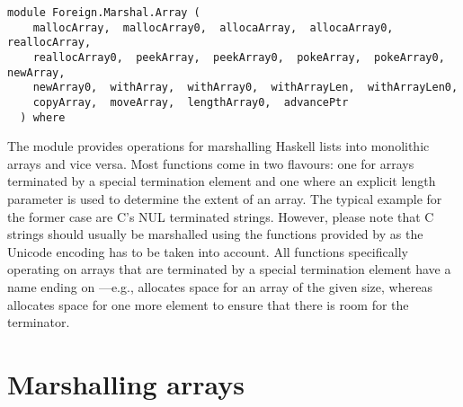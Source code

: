 \label{module:Foreign.Marshal.Array}
\haddockbeginheader
{\haddockverb\begin{verbatim}
module Foreign.Marshal.Array (
    mallocArray,  mallocArray0,  allocaArray,  allocaArray0,  reallocArray, 
    reallocArray0,  peekArray,  peekArray0,  pokeArray,  pokeArray0,  newArray, 
    newArray0,  withArray,  withArray0,  withArrayLen,  withArrayLen0, 
    copyArray,  moveArray,  lengthArray0,  advancePtr
  ) where\end{verbatim}}
\haddockendheader

The module  provides operations for marshalling Haskell
lists into monolithic arrays and vice versa.  Most functions come in two
flavours: one for arrays terminated by a special termination element and one
where an explicit length parameter is used to determine the extent of an
array.  The typical example for the former case are C's NUL terminated
strings.  However, please note that C strings should usually be marshalled
using the functions provided by  as
the Unicode encoding has to be taken into account.  All functions specifically
operating on arrays that are terminated by a special termination element have
a name ending on ---e.g.,  allocates space for an
array of the given size, whereas  allocates space for one
more element to ensure that there is room for the terminator.
\par

\section{Marshalling arrays
}
